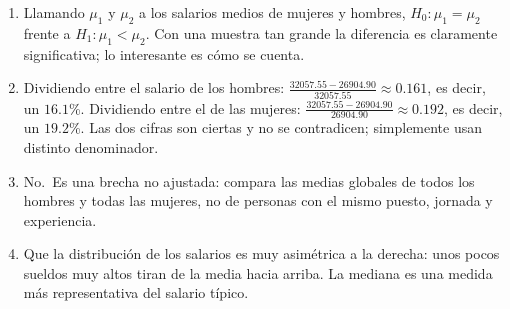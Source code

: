 \documentclass[
  spanish,
  a4paper,
]{scrreport}
\theoremstyle{definition}
\theoremstyle{remark}
\begin{document}
\begin{tcolorbox}[enhanced jigsaw, arc=.35mm, bottomrule=.15mm, bottomtitle=1mm, breakable, colback=white, colbacktitle=quarto-callout-tip-color!10!white, colframe=quarto-callout-tip-color-frame, coltitle=black, left=2mm, leftrule=.75mm, opacityback=0, opacitybacktitle=0.6, rightrule=.15mm, title=\textcolor{quarto-callout-tip-color}{\faLightbulb}\hspace{0.5em}{Solución}, titlerule=0mm, toprule=.15mm, toptitle=1mm]

\begin{enumerate}
\def\labelenumi{\alph{enumi}.}
\item
  Llamando \(\mu_1\) y \(\mu_2\) a los salarios medios de mujeres y
  hombres, \(H_0: \mu_1=\mu_2\) frente a \(H_1: \mu_1<\mu_2\). Con una
  muestra tan grande la diferencia es claramente significativa; lo
  interesante es cómo se cuenta.
\item
  Dividiendo entre el salario de los hombres:
  \(\frac{32057.55-26904.90}{32057.55}\approx 0.161\), es decir, un
  \(16.1\)\%. Dividiendo entre el de las mujeres:
  \(\frac{32057.55-26904.90}{26904.90}\approx 0.192\), es decir, un
  \(19.2\)\%. Las dos cifras son ciertas y no se contradicen;
  simplemente usan distinto denominador.
\item
  No.~Es una brecha no ajustada: compara las medias globales de todos
  los hombres y todas las mujeres, no de personas con el mismo puesto,
  jornada y experiencia.
\item
  Que la distribución de los salarios es muy asimétrica a la derecha:
  unos pocos sueldos muy altos tiran de la media hacia arriba. La
  mediana es una medida más representativa del salario típico.
\end{enumerate}

\end{tcolorbox}
\end{document}

